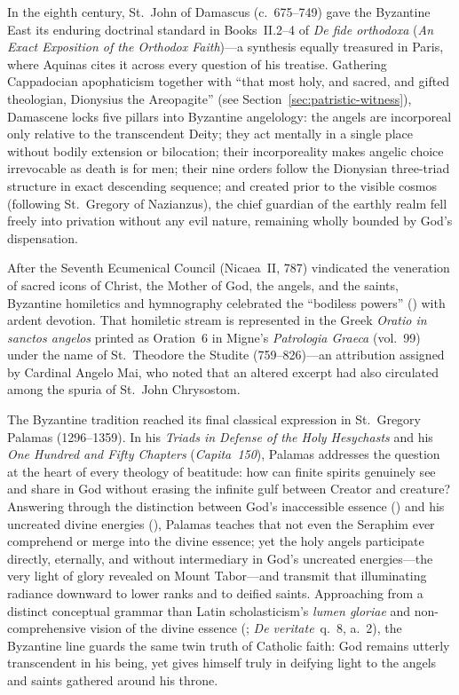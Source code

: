 In the eighth century, St.~John of Damascus (c.~675--749) gave the Byzantine East its enduring doctrinal standard in Books~II.2--4 of \emph{De fide orthodoxa} (\emph{An Exact Exposition of the Orthodox Faith})---a synthesis equally treasured in Paris, where Aquinas cites it across every question of his treatise. Gathering Cappadocian apophaticism together with ``that most holy, and sacred, and gifted theologian, Dionysius the Areopagite'' (see Section~\ref{sec:patristic-witness}), Damascene locks five pillars into Byzantine angelology: the angels are incorporeal only relative to the transcendent Deity; they act mentally in a single place without bodily extension or bilocation; their incorporeality makes angelic choice irrevocable as death is for men; their nine orders follow the Dionysian three-triad structure in exact descending sequence; and created prior to the visible cosmos (following St.~Gregory of Nazianzus), the chief guardian of the earthly realm fell freely into privation without any evil nature, remaining wholly bounded by God's dispensation.

After the Seventh Ecumenical Council (Nicaea~II, 787) vindicated the veneration of sacred icons of Christ, the Mother of God, the angels, and the saints, Byzantine homiletics and hymnography celebrated the ``bodiless powers'' () with ardent devotion. That homiletic stream is represented in the Greek \emph{Oratio in sanctos angelos} printed as Oration~6 in Migne's \emph{Patrologia Graeca} (vol.~99) under the name of St.~Theodore the Studite (759--826)---an attribution assigned by Cardinal Angelo Mai, who noted that an altered excerpt had also circulated among the spuria of St.~John Chrysostom.

The Byzantine tradition reached its final classical expression in St.~Gregory Palamas (1296--1359). In his \emph{Triads in Defense of the Holy Hesychasts} and his \emph{One Hundred and Fifty Chapters} (\emph{Capita~150}), Palamas addresses the question at the heart of every theology of beatitude: how can finite spirits genuinely see and share in God without erasing the infinite gulf between Creator and creature? Answering through the distinction between God's inaccessible essence () and his uncreated divine energies (), Palamas teaches that not even the Seraphim ever comprehend or merge into the divine essence; yet the holy angels participate directly, eternally, and without intermediary in God's uncreated energies---the very light of glory revealed on Mount Tabor---and transmit that illuminating radiance downward to lower ranks and to deified saints. Approaching from a distinct conceptual grammar than Latin scholasticism's \emph{lumen gloriae} and non-comprehensive vision of the divine essence (; \emph{De veritate}~q.~8, a.~2), the Byzantine line guards the same twin truth of Catholic faith: God remains utterly transcendent in his being, yet gives himself truly in deifying light to the angels and saints gathered around his throne.
